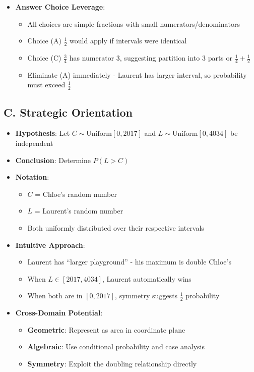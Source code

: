 \documentclass[]{article}
\begin{document}
\begin{problemconfigbox}
\begin{itemize}[leftmargin=*]
    \item \textbf{Answer Choice Leverage}: 
    \begin{itemize}
        \item All choices are simple fractions with small numerators/denominators
        \item Choice (A) $\frac{1}{2}$ would apply if intervals were identical
        \item Choice (C) $\frac{3}{4}$ has numerator 3, suggesting partition into 3 parts or $\frac{1}{4} + \frac{1}{2}$
        \item Eliminate (A) immediately - Laurent has larger interval, so probability must exceed $\frac{1}{2}$
    \end{itemize}
\end{itemize}

\subsection*{C. Strategic Orientation}
\begin{itemize}[leftmargin=*]
    \item \textbf{Hypothesis}: Let $C \sim \text{Uniform}[0, 2017]$ and $L \sim \text{Uniform}[0, 4034]$ be independent
    \item \textbf{Conclusion}: Determine $P(L > C)$
    \item \textbf{Notation}: 
    \begin{itemize}
        \item $C$ = Chloe's random number
        \item $L$ = Laurent's random number
        \item Both uniformly distributed over their respective intervals
    \end{itemize}
    
    \item \textbf{Intuitive Approach}: 
    \begin{itemize}
        \item Laurent has ``larger playground'' - his maximum is double Chloe's
        \item When $L \in [2017, 4034]$, Laurent automatically wins
        \item When both are in $[0, 2017]$, symmetry suggests $\frac{1}{2}$ probability
    \end{itemize}
    
    \item \textbf{Cross-Domain Potential}: 
    \begin{itemize}
        \item \textbf{Geometric}: Represent as area in coordinate plane
        \item \textbf{Algebraic}: Use conditional probability and case analysis
        \item \textbf{Symmetry}: Exploit the doubling relationship directly
    \end{itemize}
\end{itemize}
\end{problemconfigbox}
\end{document}
